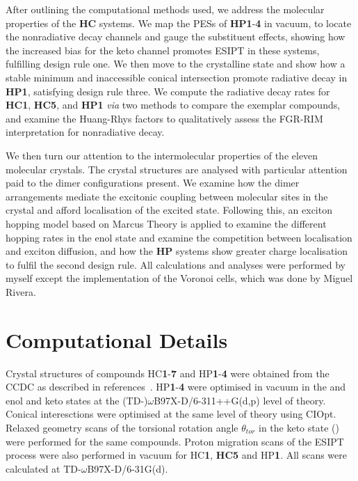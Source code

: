 After outlining the computational methods used, we address the molecular properties of the \textbf{HC} systems. We map the \acp{PES} of \textbf{HP1}-\textbf{4} in vacuum, to locate the nonradiative decay channels and gauge the substituent effects, showing how the increased bias for the keto channel promotes \ac{ESIPT} in these systems, fulfilling design rule one. We then move to the crystalline state and show how a stable \Kstar{} minimum and inaccessible conical intersection promote radiative decay in \textbf{HP1}, satisfying design rule three. We compute the radiative decay rates for \textbf{HC1}, \textbf{HC5}, and \textbf{HP1} \textit{via} two methods to compare the exemplar compounds, and examine the Huang-Rhys factors to qualitatively assess the \ac{FGR-RIM} interpretation for nonradiative decay.

We then turn our attention to the intermolecular properties of the eleven molecular crystals. The crystal structures are analysed with particular attention paid to the dimer configurations present. We examine how the dimer arrangements mediate the excitonic coupling between molecular sites in the crystal and afford localisation of the excited state. Following this, an exciton hopping model based on Marcus Theory is applied to examine the different hopping rates in the enol state and examine the competition between localisation and exciton diffusion, and how the \textbf{HP} systems show greater charge localisation to fulfil the second design rule.  All calculations and analyses were performed by myself except the implementation of the Voronoi cells, which was done by Miguel Rivera.

\section{Computational Details}\label{section: Connecting_Comp}
Crystal structures of compounds \ac{HC}\textbf{1}-\textbf{7} and \ac{HP}\textbf{1}-\textbf{4} were obtained from the CCDC as described in references{~}. \ac{HP}\textbf{1}-\textbf{4} were optimised in vacuum in the \szero{} and \sone{} enol and keto states at the (TD-)$\omega$B97X-D/6-311++G(d,p) level of theory. Conical interesctions were optimised at the same level of theory using CIOpt. Relaxed geometry scans of the torsional rotation angle $\theta_{tor}$ in the keto \sone{} state (\Kstar) were performed for the same compounds. Proton migration scans of the ESIPT process were also performed in vacuum for \ac{HC}\textbf{1}, \textbf{HC5} and \ac{HP}\textbf{1}. All scans were calculated at TD-$\omega$B97X-D/6-31G(d). 

